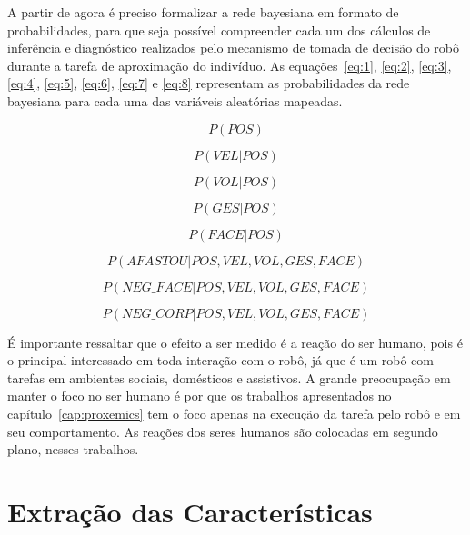 A partir de agora é preciso formalizar a rede bayesiana em formato de probabilidades, para que seja possível compreender cada um dos cálculos de inferência e diagnóstico realizados pelo mecanismo de tomada de decisão do robô durante a tarefa de aproximação do indivíduo. As equações~\ref{eq:1}, \ref{eq:2}, \ref{eq:3}, \ref{eq:4}, \ref{eq:5}, \ref{eq:6}, \ref{eq:7} e \ref{eq:8} representam as probabilidades da rede bayesiana para cada uma das variáveis aleatórias mapeadas.

\begin{equation}
	\label{eq:1}
	P(POS)
\end{equation}

\begin{equation}
	\label{eq:2}
	P(VEL|POS)
\end{equation}

\begin{equation}
	\label{eq:3}
	P(VOL|POS)
\end{equation}

\begin{equation}
	\label{eq:4}
	P(GES|POS)
\end{equation}

\begin{equation}
	\label{eq:5}
	P(FACE|POS)
\end{equation}

\begin{equation}
	\label{eq:6}
	P(AFASTOU|POS, VEL, VOL, GES, FACE)
\end{equation}

\begin{equation}
	\label{eq:7}
	P(NEG\_FACE|POS, VEL, VOL, GES, FACE)
\end{equation}

\begin{equation}
	\label{eq:8}
	P(NEG\_CORP|POS, VEL, VOL, GES, FACE)
\end{equation}

É importante ressaltar que o efeito a ser medido é a reação do ser humano, pois é o principal interessado em toda interação com o robô, já que é um robô com tarefas em ambientes sociais, domésticos e assistivos. A grande preocupação em manter o foco no ser humano é por que os trabalhos apresentados no capítulo~\ref{cap:proxemics} tem o foco apenas na execução da tarefa pelo robô e em seu comportamento. As reações dos seres humanos são colocadas em segundo plano, nesses trabalhos.

\section{Extração das Características}
\label{sec:extracaocaracteristicas}

